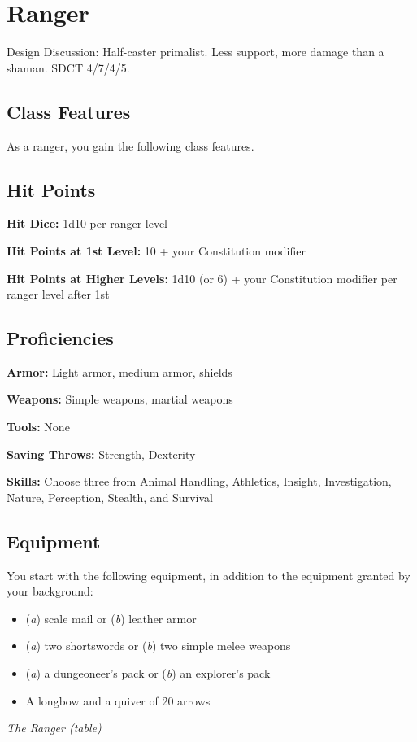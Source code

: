 \section{Ranger}

Design Discussion: Half-caster primalist. Less support, more damage than a shaman. SDCT 4/7/4/5.

\subsection{Class Features}

As a ranger, you gain the following class features.

\subsection{Hit Points}

\textbf{Hit Dice:} 1d10 per ranger level

\textbf{Hit Points at 1st Level:} 10 + your Constitution modifier

\textbf{Hit Points at Higher Levels:} 1d10 (or 6) + your Constitution modifier per ranger level after 1st

\subsection{Proficiencies}

\textbf{Armor:} Light armor, medium armor, shields

\textbf{Weapons:} Simple weapons, martial weapons

\textbf{Tools:} None

\textbf{Saving Throws:} Strength, Dexterity

\textbf{Skills:} Choose three from Animal Handling, Athletics, Insight, Investigation, Nature, Perception, Stealth, and Survival

\subsection{Equipment}

You start with the following equipment, in addition to the equipment granted by your background:
\begin{itemize}
\item (\textit{a}) scale mail or (\textit{b}) leather armor
\item (\textit{a}) two shortswords or (\textit{b}) two simple melee weapons
\item (\textit{a}) a dungeoneer's pack or (\textit{b}) an explorer's pack
\item A longbow and a quiver of 20 arrows
\end{itemize}
\textit{The Ranger (table)}


